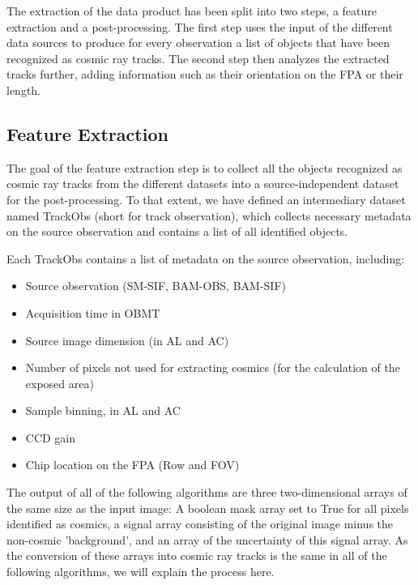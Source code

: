 \documentclass[a4paper, 11pt]{article}
\begin{document}
The extraction of the data product has been split into two steps, a feature extraction and a post-processing. The first step uses the input of the different data sources to produce for every observation a list of objects that have been recognized as cosmic ray tracks. The second step then analyzes the extracted tracks further, adding information such as their orientation on the FPA or their length.

\subsection{Feature Extraction}
\label{sec:extraction}

The goal of the feature extraction step is to collect all the objects recognized as cosmic ray tracks from the different datasets into a source-independent dataset for the post-processing. To that extent, we have defined an intermediary dataset named TrackObs (short for track observation), which collects necessary metadata on the source observation and contains a list of all identified objects.

Each TrackObs contains a list of metadata on the source observation, including:
\begin{itemize}
  \item Source observation (SM-SIF, BAM-OBS, BAM-SIF)
  \item Acquisition time in OBMT
  \item Source image dimension (in AL and AC)
  \item Number of pixels not used for extracting cosmics (for the calculation of the exposed area)
  \item Sample binning, in AL and AC
  \item CCD gain
  \item Chip location on the FPA (Row and FOV)
\end{itemize}

The output of all of the following algorithms are three two-dimensional arrays of the same size as the input image: A boolean mask array set to True for all pixels identified as cosmics, a signal array consisting of the original image minus the non-cosmic 'background', and an array of the uncertainty of this signal array. As the conversion of these arrays into cosmic ray tracks is the same in all of the following algorithms, we will explain the process here. 
\end{document}
